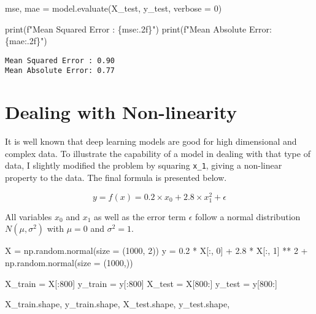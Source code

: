 \documentclass[
  letterpaper,
  DIV=11,
  numbers=noendperiod]{scrreprt}
\newenvironment{Shaded}{\begin{snugshade}}{\end{snugshade}}
\newcommand{\BuiltInTok}[1]{\textcolor[rgb]{0.00,0.23,0.31}{#1}}
\newcommand{\DecValTok}[1]{\textcolor[rgb]{0.68,0.00,0.00}{#1}}
\newcommand{\FloatTok}[1]{\textcolor[rgb]{0.68,0.00,0.00}{#1}}
\newcommand{\NormalTok}[1]{\textcolor[rgb]{0.00,0.23,0.31}{#1}}
\newcommand{\OperatorTok}[1]{\textcolor[rgb]{0.37,0.37,0.37}{#1}}
\newcommand{\SpecialCharTok}[1]{\textcolor[rgb]{0.37,0.37,0.37}{#1}}
\newcommand{\SpecialStringTok}[1]{\textcolor[rgb]{0.13,0.47,0.30}{#1}}
\begin{document}
\begin{Shaded}
\begin{Highlighting}[]
\NormalTok{mse, mae }\OperatorTok{=}\NormalTok{ model.evaluate(X\_test, y\_test, verbose }\OperatorTok{=} \DecValTok{0}\NormalTok{)}

\BuiltInTok{print}\NormalTok{(}\SpecialStringTok{f"Mean Squared Error : }\SpecialCharTok{\{}\NormalTok{mse}\SpecialCharTok{:.2f\}}\SpecialStringTok{"}\NormalTok{)}
\BuiltInTok{print}\NormalTok{(}\SpecialStringTok{f"Mean Absolute Error: }\SpecialCharTok{\{}\NormalTok{mae}\SpecialCharTok{:.2f\}}\SpecialStringTok{"}\NormalTok{)}
\end{Highlighting}
\end{Shaded}

\begin{verbatim}
Mean Squared Error : 0.90
Mean Absolute Error: 0.77
\end{verbatim}

\hypertarget{dealing-with-non-linearity}{%
\section{Dealing with Non-linearity}\label{dealing-with-non-linearity}}

It is well known that deep learning models are good for high dimensional
and complex data. To illustrate the capability of a model in dealing
with that type of data, I slightly modified the problem by squaring
\texttt{x\_1}, giving a non-linear property to the data. The final
formula is presented below.

\[
    y = f(x) = 0.2 \times x_0 + 2.8 \times x_1^2 + \epsilon 
\]

All variables \(x_0\) and \(x_1\) as well as the error term \(\epsilon\)
follow a normal distribution \(N(\mu, \sigma^2)\) with \(\mu = 0\) and
\(\sigma^2 = 1\).

\begin{Shaded}
\begin{Highlighting}[]
\NormalTok{X }\OperatorTok{=}\NormalTok{ np.random.normal(size }\OperatorTok{=}\NormalTok{ (}\DecValTok{1000}\NormalTok{, }\DecValTok{2}\NormalTok{))}
\NormalTok{y }\OperatorTok{=} \FloatTok{0.2} \OperatorTok{*}\NormalTok{ X[:, }\DecValTok{0}\NormalTok{] }\OperatorTok{+} \FloatTok{2.8} \OperatorTok{*}\NormalTok{ X[:, }\DecValTok{1}\NormalTok{] }\OperatorTok{**} \DecValTok{2} \OperatorTok{+}\NormalTok{ np.random.normal(size }\OperatorTok{=}\NormalTok{ (}\DecValTok{1000}\NormalTok{,))}

\NormalTok{X\_train }\OperatorTok{=}\NormalTok{ X[:}\DecValTok{800}\NormalTok{]}
\NormalTok{y\_train }\OperatorTok{=}\NormalTok{ y[:}\DecValTok{800}\NormalTok{]}
\NormalTok{X\_test }\OperatorTok{=}\NormalTok{ X[}\DecValTok{800}\NormalTok{:]}
\NormalTok{y\_test }\OperatorTok{=}\NormalTok{ y[}\DecValTok{800}\NormalTok{:]}

\NormalTok{X\_train.shape, y\_train.shape, X\_test.shape, y\_test.shape, }
\end{Highlighting}
\end{Shaded}
\end{document}
